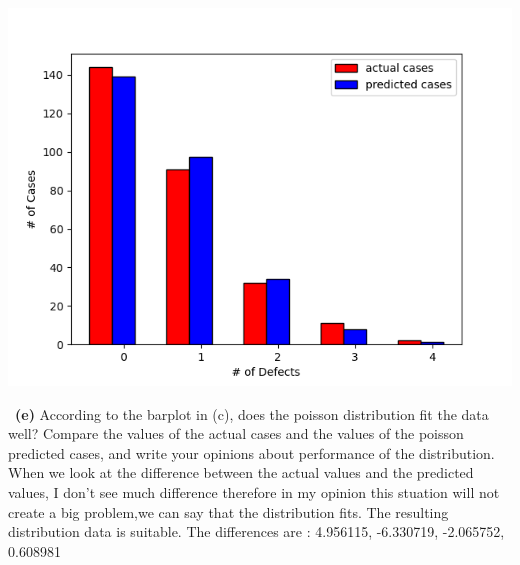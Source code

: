 \documentclass[a4 paper]{article}
\numberwithin{equation}{section}
\newcommand{\subproblem}[1]{~\newline\textbf{(#1)}}
\newcommand{\0}{\mathbf{0}}
\begin{document}
	\centering
	\includegraphics{Figure_1.png}

	
	\subproblem{e} According to the barplot in (c), does the poisson distribution fit the data well? Compare the values of the actual cases and the values of the poisson predicted cases, and write your opinions about performance of the distribution.\\
	When we look at the difference between the actual values and the predicted values, I don't see much difference therefore in my opinion this stuation will not create a big problem,we can say that the distribution fits. The resulting distribution data is suitable.
	The differences are :
4.956115, -6.330719, -2.065752, 0.608981
\end{document}

